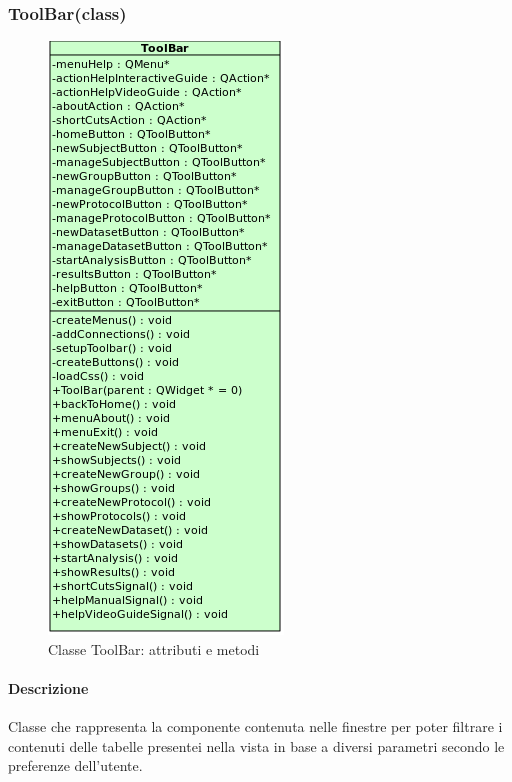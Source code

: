 \subsubsection{ToolBar(class)}
\label{spetool}
\begin{figure}[!h]
\centering
			\includegraphics[width=0.65\linewidth]{./Content/Immagini/view/ToolBar.png}
			\caption{Classe ToolBar: attributi e metodi}
			\label{cl_tool}
\end{figure}
\paragraph{Descrizione \\}
Classe che rappresenta la componente contenuta nelle finestre per poter filtrare i contenuti delle tabelle presentei nella vista in base a diversi parametri secondo le preferenze dell'utente.
